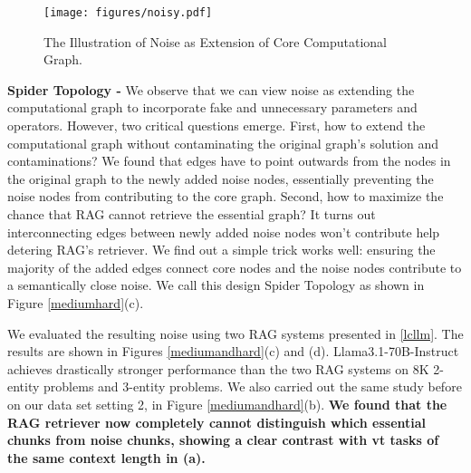 \begin{wrapfigure}{r}{0.35\textwidth} 
    \texttt{[image: figures/noisy.pdf]} 
    \caption{The Illustration of Noise as Extension of Core Computational Graph.} 
    \label{noisytwo} 
\end{wrapfigure} 

\textbf{Spider Topology -} We observe that we can view noise as extending the computational graph to incorporate fake and unnecessary parameters and operators. However, two critical questions emerge. First, how to extend the computational graph without contaminating the original graph's solution and contaminations? We found that edges have to point outwards from the nodes in the original graph to the newly added noise nodes, essentially preventing the noise nodes from contributing to the core graph. Second, how to maximize the chance that RAG cannot retrieve the essential graph? It turns out interconnecting edges between newly added noise nodes won't contribute help detering RAG's retriever. We find out a simple trick works well: ensuring the majority of the added edges connect core nodes and the noise nodes contribute to a semantically close noise. We call this design Spider Topology as shown in Figure \ref{mediumhard}(c). 

We evaluated the resulting noise using two RAG systems presented in \ref{lcllm}. The results are shown in Figures \ref{mediumandhard}(c) and (d). Llama3.1-70B-Instruct achieves drastically stronger performance than the two RAG systems on 8K 2-entity problems and 3-entity problems. We also carried out the same study before on our data set setting 2, in Figure \ref{mediumandhard}(b). \textbf{We found that the RAG retriever now completely cannot distinguish which essential chunks from noise chunks, showing a clear contrast with vt tasks of the same context length in (a).}  
